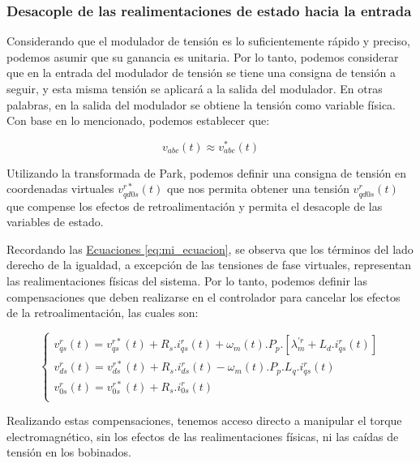 \documentclass{article}
\begin{document}

\subsubsection{Desacople de las realimentaciones de estado hacia la entrada}

Considerando que el modulador de tensión es lo suficientemente rápido y preciso, podemos asumir que su ganancia 
es unitaria. Por lo tanto, podemos considerar que en la entrada del modulador de tensión se tiene una consigna 
de tensión a seguir, y esta misma tensión se aplicará a la salida del modulador. 
En otras palabras, en la salida del modulador se obtiene la tensión como variable física. Con base en lo 
mencionado, podemos establecer que:

\begin{equation}
    v_{abc}(t) \approx v^*_{abc}(t)
\end{equation}

Utilizando la transformada de Park, podemos definir una consigna de tensión en coordenadas virtuales 
$v^{r*}_{qd0s}(t)$ que nos permita obtener una tensión $v^{r}_{qd0s}(t)$ que compense los efectos de 
retroalimentación y permita el desacople de las variables de estado.

Recordando las \hyperref[eq:mi_ecuacion]{Ecuaciones \ref*{eq:mi_ecuacion}}, se observa que los términos 
del lado derecho de la igualdad, a excepción de las tensiones de fase virtuales, representan las 
realimentaciones físicas del sistema. Por lo tanto, podemos definir las compensaciones que deben 
realizarse en el controlador para cancelar los efectos de la retroalimentación, las cuales son:

\begin{equation}\label{eq:compensaciones}
    \begin{cases}
        v^r_{qs}(t) = v^{r*}_{qs}(t) + R_{s}.i_{qs}^r(t) + \omega_m(t).P_p.[\lambda^{\prime r}_m + L_d.i_{qs}^r(t)] \\
        v^r_{ds}(t) = v^{r*}_{ds}(t) + R_{s}.i_{ds}^r(t) - \omega_m(t).P_p.L_q.i_{qs}^r(t) \\
        v^r_{0s}(t) = v^{r*}_{0s}(t) + R_{s}.i_{0s}^r(t) \\
    \end{cases}
\end{equation}

Realizando estas compensaciones, tenemos acceso directo a manipular el torque electromagnético, 
sin los efectos de las realimentaciones físicas, ni las caídas de tensión en los bobinados.
\end{document}
